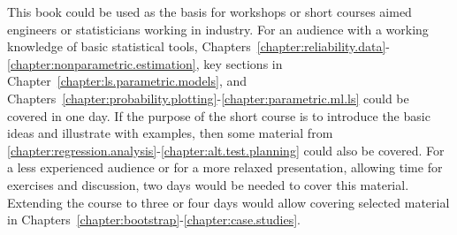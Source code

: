This book could be used as the basis for workshops or short courses
aimed engineers or statisticians working in industry.  For an audience
with a working knowledge of basic statistical tools,
Chapters~\ref{chapter:reliability.data}-\ref{chapter:nonparametric.estimation},
key sections in Chapter~\ref{chapter:ls.parametric.models}, and
Chapters~\ref{chapter:probability.plotting}-\ref{chapter:parametric.ml.ls}
could be covered in one day. If the purpose of the short course is
to introduce the basic ideas and illustrate with examples, then some
material from
\ref{chapter:regression.analysis}-\ref{chapter:alt.test.planning}
could also be covered. For a less experienced audience or for a
more relaxed presentation, allowing time for exercises and discussion,
two days would be needed to cover this material.  Extending the course
to three or four days would allow covering selected material in
Chapters~\ref{chapter:bootstrap}-\ref{chapter:case.studies}.







